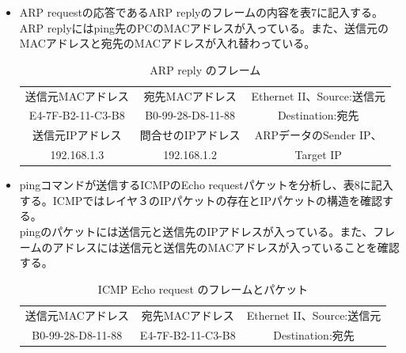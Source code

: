\documentclass[10pt]{article}
\begin{document}
\begin{enumerate}
\begin{itemize}
            \item ARP requestの応答であるARP replyのフレームの内容を表7に記入する。\\
            ARP replyにはping先のPCのMACアドレスが入っている。また、送信元のMACアドレスと宛先のMACアドレスが入れ替わっている。
                \begingroup
                    \setlength{\tabcolsep}{5pt} %
                    \renewcommand{\arraystretch}{1.5} %
                    \begin{table}[H]
                    \centering
                	\caption{ARP reply のフレーム}
                	\begin{tabular}{|c|c|c|} 
                    	\hline
                    	    送信元MACアドレス &  宛先MACアドレス  & Ethernet II、Source:送信元\\
                    	    E4-7F-B2-11-C3-B8  & B0-99-28-D8-11-88 & Destination:宛先\\ [0.5ex] 
                    	\hline
                    	    送信元IPアドレス &  問合せのIPアドレス  & ARPデータのSender IP、\\
                    	     192.168.1.3 & 192.168.1.2  & Target IP\\ [0.5ex] 
                    	\hline
                    \end{tabular}
                    \end{table} 
                    \endgroup
            \item pingコマンドが送信するICMPのEcho requestパケットを分析し、表8に記入する。ICMPではレイヤ３のIPパケットの存在とIPパケットの構造を確認する。 \\
                pingのパケットには送信元と送信先のIPアドレスが入っている。また、フレームのアドレスには送信元と送信先のMACアドレスが入っていることを確認する。
                \begingroup
                    \setlength{\tabcolsep}{5pt} %
                    \renewcommand{\arraystretch}{1.5} %
                    \begin{table}[H]
                    \centering
                	\caption{ICMP Echo request のフレームとパケット}
                	\begin{tabular}{|c|c|c|} 
                    	\hline
                    	    送信元MACアドレス &  宛先MACアドレス  & Ethernet II、Source:送信元\\
                    	    B0-99-28-D8-11-88  & E4-7F-B2-11-C3-B8 & Destination:宛先\\ [0.5ex] 
                    	\hline

\end{tabular}
\end{table}
\end{itemize}
\end{enumerate}
\end{document}

